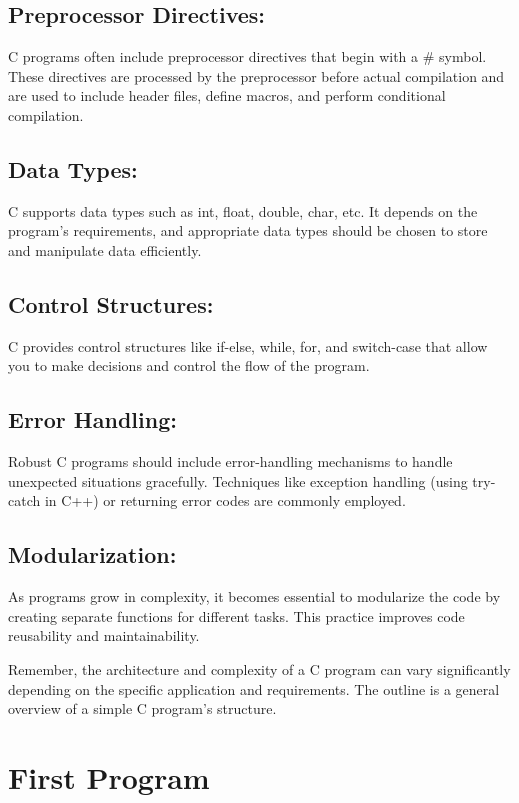 \documentclass[11pt]{article}
\begin{document}
\subsection{Preprocessor Directives:}
C programs often include preprocessor directives that begin with a \# symbol. These directives are processed by the preprocessor before actual compilation and are used to include header files, define macros, and perform conditional compilation.

\subsection{Data Types:}
C supports data types such as int, float, double, char, etc. It depends on the program's requirements, and appropriate data types should be chosen to store and manipulate data efficiently.

\subsection{Control Structures:}
C provides control structures like if-else, while, for, and switch-case that allow you to make decisions and control the flow of the program.

\subsection{Error Handling:}
Robust C programs should include error-handling mechanisms to handle unexpected situations gracefully. Techniques like exception handling (using try-catch in C++) or returning error codes are commonly employed.

\subsection{Modularization:}
As programs grow in complexity, it becomes essential to modularize the code by creating separate functions for different tasks. This practice improves code reusability and maintainability.

Remember, the architecture and complexity of a C program can vary significantly depending on the specific application and requirements. The outline is a general overview of a simple C program's structure.


\section{First Program}
\end{document}
